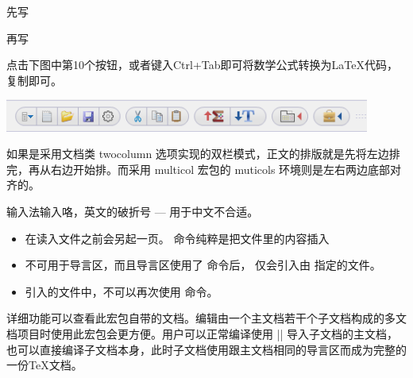 
先写
\begin{texlist}
\end{texlist}

再写
\begin{texlist}
  \usepackage{hyperref}
\end{texlist}



点击下图中第10个按钮，或者键入Ctrl+Tab即可将数学公式转换为\LaTeX{}代码，复制即可。

\includegraphics[width=0.9\textwidth]{../images/amxmath_texstudio}



如果是采用文档类 twocolumn 选项实现的双栏模式，正文的排版就是先将左边排完，再从右边开始排。而采用
multicol 宏包的 muticols 环境则是左右两边底部对齐的。



输入法输入咯，英文的破折号 --- 用于中文不合适。



\begin{itemize}
\item {} 在读入文件之前会另起一页。 命令纯粹是把文件里的内容插入
\item {} 不可用于导言区，而且导言区使用了  命令后，
   仅会引入由  指定的文件。
\item {} 引入的文件中，不可以再次使用  命令。
\end{itemize}



详细功能可以查看此宏包自带的文档。编辑由一个主文档若干个子文档构成的多文档项目时使用此宏包会更方便。用户可以正常编译使用
|| 导入子文档的主文档，也可以直接编译子文档本身，此时子文档使用跟主文档相同的导言区而成为完整的一份\TeX{}文档。






